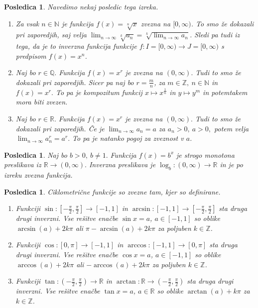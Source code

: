\documentclass[10pt, a4paper]{article}
\newtheorem{posledica}[izr]{Posledica}
\newcommand{\N}{\mathbb {N}}
\newcommand{\Z}{\mathbb {Z}}
\newcommand{\Q}{\mathbb {Q}}
\newcommand{\R}{\mathbb {R}}
\newcommand{\limzap}[1]{\lim_{n \to \infty} {#1}}
\begin{document}
\begin{posledica} Navedimo nekaj posledic tega izreka.
    \begin{enumerate}
        \item Za vsak $n \in \N$ je funkcija $f(x) = \sqrt[n]{x}$ zvezna na $[0, \infty)$.
        To smo že dokazali pri zaporedjih, saj velja 
        $\limzap{\sqrt[k]{a_n}} = \sqrt[k]{\limzap{a_n}}$.
        Sledi pa tudi iz tega, da je to inverzna funkcija funkcije $f: I = [0, \infty) \rightarrow J = [0,\infty)$ s predpisom $f(x) = x^n$.
        
        \item Naj bo $r \in \Q.$ Funkcija $f(x) = x^r$ je zvezna na $(0,\infty).$
        Tudi to smo že dokazali pri zaporedjih. Sicer pa naj bo $r = \frac{m}{n}$, za  $m \in \Z,\ n \in \N$ in 
        $f(x)= x^r.$ To pa je kompozitum funkcij $x \mapsto x^{\frac{1}{n}}$ in $y \mapsto y^m$ in potemtakem mora biti zvezen.
        
        \item Naj bo $r \in \R.$ Funkcija $f(x) = x^r$ je zvezna na $(0,\infty).$
        Tudi to smo že dokazali pri zaporedjih. Če je
        $\limzap{a_n} = a$ za $a_n >0,\ a>0,$ potem velja
        $\limzap{a_n^r} = a^r.$ To pa je natanko pogoj za zveznost v $a$.
    \end{enumerate}
\end{posledica}        

\begin{posledica}
    Naj bo $b > 0,\ b \neq 1.$ Funkcija
        $f(x) = b^x$ je strogo monotona preslikava iz
        $\R \rightarrow (0,\infty).$ Inverzna preslikava je $\log_b : (0,\infty) \rightarrow \R$ in je po izreku zvezna funkcija.
\end{posledica}
        
\begin{posledica}
    Ciklometrične funkcije so zvezne tam, kjer so definirane.
        \begin{enumerate}
            \item Funkciji $\sin : [-\frac{\pi}{2}, \frac{\pi}{2}] \rightarrow [-1,1]$ in 
                $\arcsin : [-1,1] \rightarrow [-\frac{\pi}{2},\frac{\pi}{2}]$
            sta druga drugi inverzni. Vse rešitve enačbe $\sin x = a$, $a \in [-1,1]$ so oblike $\arcsin(a) + 2k\pi$ ali $\pi - \arcsin(a) + 2k\pi$ za poljuben $k \in \Z$.
            
            \item Funkciji
                $\cos : [0, \pi] \rightarrow [-1,1]$ in
                $\arccos : [-1,1] \rightarrow [0, \pi]$
            sta druga drugi inverzni. Vse rešitve enačbe $\cos x = a$, $a \in [-1,1]$ so oblike $\arccos(a) + 2k\pi$ ali $-\arccos(a) + 2k\pi$ za poljuben $k \in \Z$.
            
            \item Funkciji
                $\tan : (-\frac{\pi}{2}, \frac{\pi}{2}) \rightarrow \R$ in
                $\arctan : \R \rightarrow (-\frac{\pi}{2}, \frac{\pi}{2})$
            sta druga drugi inverzni. Vse rešitve enačbe $\tan x = a$, $a \in \R$ so oblike $\arctan(a) + k\pi$ za $k \in \Z$.
        \end{enumerate}
\end{posledica}
\end{document}
